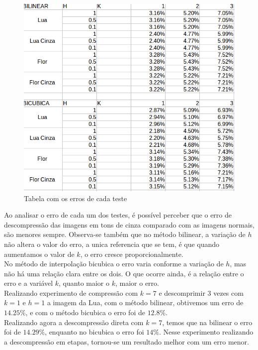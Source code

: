 \documentclass{article}
\newcommand\tab[1][1cm]{\hspace*{#1}}
\begin{document}
		\begin{figure}[!hbt]
			\centering
			\includegraphics[width=0.7\linewidth]{imgs/erros.png}
			\caption{Tabela com os erros de cada teste}
		\end{figure}
			\tab Ao analisar o erro de cada um dos testes, é possível perceber que o erro de descompressão das imagens em tons de cinza comparado com as imagens normais, são menores sempre. Observa-se também que no método bilinear, a variação  de $h$ não altera o valor do erro, a unica referencia que se tem, é que quando aumentamos o valor de $k$, o erro cresce proporcionalmente. \\
			\tab No método de interpolação bicubica o erro varia conforme a variação de $h$, mas não há uma relação clara entre os dois. O que ocorre ainda, é a relação entre o erro e a variável $k$, quanto maior o $k$, maior o erro.\\
			\tab Realizando experimento de compressão com $k=7$ e descomprimir $3$ vezes com $k=1$ e $h=1$ a imagem da Lua, com o método bilinear, obtivemos um erro de $14.25\%$, e com o método bicubica o erro foi de $12.8\%$.\\
			Realizando agora a descompressão direta com $ k = 7 $, temos que na bilinear o erro foi de $14.29\%$, enquanto no bicubica o erro foi $14\%$. Nesse experimento realizando a descompressão em etapas, tornou-se um resultado melhor com um erro menor.
			
\end{document}

